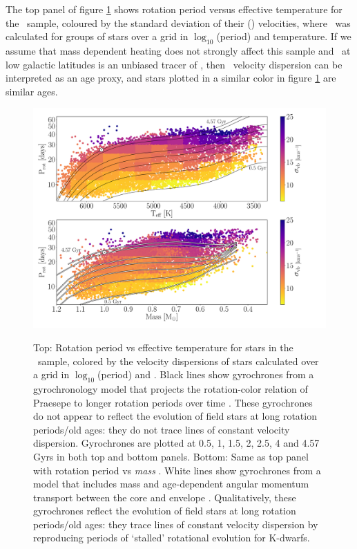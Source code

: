 The top panel of figure \ref{fig:vplot} shows rotation period versus effective
temperature for the \mct\ sample, coloured by the standard deviation of their
(\vb) velocities, where \sigmavb\ was calculated for groups of stars over a
grid in $\log_{10}$(period) and temperature.
If we assume that mass dependent heating does not strongly affect this sample
and \vb\ at low galactic latitudes is an unbiased tracer of \vz, then \vb\
velocity dispersion can be interpreted as an age proxy, and stars plotted in a
similar color in figure \ref{fig:vplot} are similar ages.
\begin{figure}
  \caption{
    Top: Rotation period vs effective temperature for stars in the \mct\
    sample, colored by the velocity dispersions of stars calculated over a
    grid in $\log_{10}$(period) and \teff.
    Black lines show gyrochrones from a gyrochronology model that projects the
    rotation-color relation of
    Praesepe to longer rotation periods over time \citep{angus2019}.
    These gyrochrones do not appear to reflect the evolution of field stars at
    long rotation periods/old ages: they do not trace lines of constant
    velocity dispersion.
    Gyrochrones are plotted at 0.5, 1, 1.5, 2, 2.5, 4 and 4.57 Gyrs in both top
    and bottom panels.
    Bottom: Same as top panel with rotation period vs {\it mass}
    \citep[from the Kepler Input Catalog][]{brown2011}.
    White lines show gyrochrones from a model that includes mass and
    age-dependent angular momentum transport between the core and envelope
    \citep{spada2019}.
    Qualitatively, these gyrochrones reflect the evolution of field
    stars at long rotation periods/old ages: they trace lines of constant
    velocity dispersion by reproducing periods of `stalled' rotational
    evolution for K-dwarfs.
}
  \centering
    \includegraphics[width=1\textwidth]{main_figure}
\label{fig:vplot}
\end{figure}
